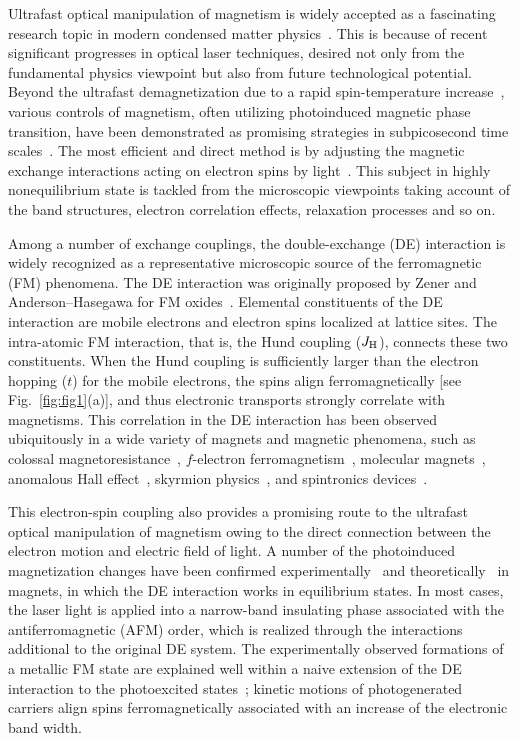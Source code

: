\documentclass[aps,twocolumn,showpacs,prl,amsmath,amssymb]{revtex4-1}
\begin{document}
Ultrafast optical manipulation of magnetism is widely accepted as a fascinating research topic in modern condensed matter physics~\cite{kirilyuk,tokura,aoki}. 
This is because of recent significant progresses in optical laser techniques, desired not only from the fundamental physics viewpoint but also from future technological potential. 
Beyond the ultrafast demagnetization due to a rapid spin-temperature increase~\cite{beaurepaire}, various controls of magnetism, often utilizing photoinduced magnetic phase transition, have been demonstrated as promising strategies in subpicosecond time scales~\cite{kirilyuk,satoh,mertelj,razdolski}. 
The most efficient and direct method is by adjusting the magnetic exchange interactions acting on electron spins by light~\cite{radu,mentink}. 
This subject in highly nonequilibrium state is tackled from the microscopic viewpoints 
taking account of the band structures, electron correlation effects, relaxation processes and so on. 

Among a number of exchange couplings, the double-exchange (DE) interaction is widely recognized as a representative microscopic source of the ferromagnetic (FM) phenomena. 
The DE interaction was originally proposed by Zener and Anderson--Hasegawa for FM oxides~\cite{zener,anderson,degennes}. 
Elemental constituents of the DE interaction are mobile electrons and electron spins localized at lattice sites. 
The intra-atomic FM interaction, that is, the Hund coupling ($J_{\rm H}$), connects these two constituents. 
When the Hund coupling is sufficiently larger than the electron hopping ($t$) for the mobile electrons, 
the spins align ferromagnetically [see Fig.~\ref{fig:fig1}(a)], 
and thus electronic transports strongly correlate with magnetisms. 
This correlation in the DE interaction has been observed ubiquitously in a wide variety 
of magnets and magnetic phenomena, such as 
colossal magnetoresistance~\cite{kaplan}, $f$-electron ferromagnetism~\cite{kasuya},
molecular magnets~\cite{bechlars}, anomalous Hall effect~\cite{tatara}, 
skyrmion physics~\cite{calderon}, and spintronics devices~\cite{shinjo}.

This electron-spin coupling also provides a promising route to the ultrafast optical manipulation of magnetism 
owing to the direct connection between the electron motion and electric field of light. 
A number of the photoinduced magnetization changes have been confirmed experimentally~\cite{fiebig,averitt,rini,ichikawa,zhao,yada,koshihara} and theoretically~\cite{chovan,matsueda,kanamori,koshibae1,koshibae2,ohara} in magnets, in which the DE interaction works in equilibrium states. In most cases, the laser light is applied into a narrow-band insulating phase associated with the antiferromagnetic (AFM) order, which is realized through the interactions additional to the original DE system.
The experimentally observed formations of a metallic FM state are explained well within a naive extension of the DE interaction to the photoexcited states~\cite{kanamori,koshibae1};
kinetic motions of photogenerated carriers align spins ferromagnetically associated with an increase of the electronic band width. 
\end{document}
